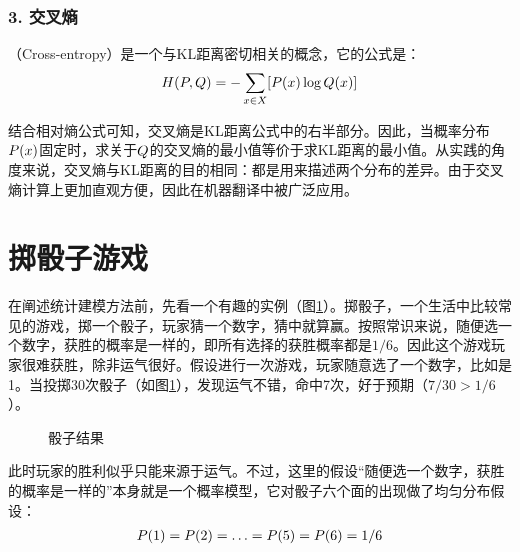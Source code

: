 \subsubsection{3. 交叉熵}

（Cross-entropy）是一个与KL距离密切相关的概念，它的公式是：
\begin{eqnarray}
{H}({P},{Q})=-\sum_{x \in X} [{P}(x) \log {Q}(x) ]
\label{eq:2-16}
\end{eqnarray}

\parinterval 结合相对熵公式可知，交叉熵是KL距离公式中的右半部分。因此，当概率分布${P}(x)$固定时，求关于${Q}$的交叉熵的最小值等价于求KL距离的最小值。从实践的角度来说，交叉熵与KL距离的目的相同：都是用来描述两个分布的差异。由于交叉熵计算上更加直观方便，因此在机器翻译中被广泛应用。


\sectionnewpage
\section{掷骰子游戏}

\parinterval 在阐述统计建模方法前，先看一个有趣的实例（图\ref{fig:2-5}）。掷骰子，一个生活中比较常见的游戏，掷一个骰子，玩家猜一个数字，猜中就算赢。按照常识来说，随便选一个数字，获胜的概率是一样的，即所有选择的获胜概率都是$1/6$。因此这个游戏玩家很难获胜，除非运气很好。假设进行一次游戏，玩家随意选了一个数字，比如是1。当投掷30次骰子（如图\ref{fig:2-5}），发现运气不错，命中7次，好于预期（$7/30 > 1/6$）。
\vspace{-0.5em}

\begin{figure}[htp]
\centering

\caption{骰子结果}
\label{fig:2-5}
\end{figure}

\parinterval 此时玩家的胜利似乎只能来源于运气。不过，这里的假设“随便选一个数字，获胜的概率是一样的”本身就是一个概率模型，它对骰子六个面的出现做了均匀分布假设：
\begin{eqnarray}
{P}(\text{1})={P}(\text{2})= \ldots ={P}(\text{5})={P}(\text{6})=1/6
\label{eq:2-17}
\end{eqnarray}

